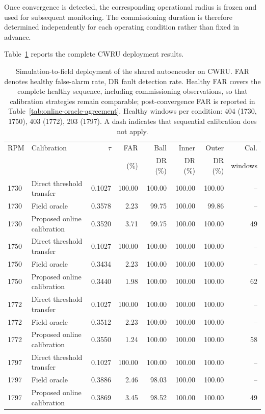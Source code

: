 \documentclass{trbunofficial}
\begin{document}
Once convergence is detected, the corresponding operational radius is frozen
and used for subsequent monitoring. The commissioning duration is therefore
determined independently for each operating condition rather than fixed in
advance.

Table~\ref{tab:shared-deployment} reports the complete CWRU deployment
results.

\begin{table}[!ht]
\centering
\caption{Simulation-to-field deployment of the shared autoencoder on CWRU.
FAR denotes healthy false-alarm rate, DR fault detection rate. Healthy FAR
covers the complete healthy sequence, including commissioning observations,
so that calibration strategies remain comparable; post-convergence FAR is
reported in Table~\ref{tab:online-oracle-agreement}. Healthy windows per condition:
404 (1730, 1750), 403 (1772), 203 (1797). A dash indicates that sequential
calibration does not apply.}
\label{tab:shared-deployment}
\setlength{\tabcolsep}{4pt}
\begin{tabular}{@{}llrrrrrr@{}}
\toprule
RPM & Calibration & $\tau$ & FAR & Ball & Inner & Outer & Cal. \\
    &             &        & (\%) & DR (\%) & DR (\%) & DR (\%) & windows \\
\midrule

1730 & Direct threshold transfer  & 0.1027 & 100.00 & 100.00 & 100.00 & 100.00 & -- \\
1730 & Field oracle               & 0.3578 &   2.23 &  99.75 & 100.00 &  99.86 & -- \\
1730 & Proposed online calibration& 0.3520 &   3.71 &  99.75 & 100.00 & 100.00 & 49 \\

\addlinespace

1750 & Direct threshold transfer  & 0.1027 & 100.00 & 100.00 & 100.00 & 100.00 & -- \\
1750 & Field oracle               & 0.3434 &   2.23 & 100.00 & 100.00 & 100.00 & -- \\
1750 & Proposed online calibration& 0.3440 &   1.98 & 100.00 & 100.00 & 100.00 & 62 \\

\addlinespace

1772 & Direct threshold transfer  & 0.1027 & 100.00 & 100.00 & 100.00 & 100.00 & -- \\
1772 & Field oracle               & 0.3512 &   2.23 & 100.00 & 100.00 & 100.00 & -- \\
1772 & Proposed online calibration& 0.3550 &   1.24 & 100.00 & 100.00 & 100.00 & 58 \\

\addlinespace

1797 & Direct threshold transfer  & 0.1027 & 100.00 & 100.00 & 100.00 & 100.00 & -- \\
1797 & Field oracle               & 0.3886 &   2.46 &  98.03 & 100.00 & 100.00 & -- \\
1797 & Proposed online calibration& 0.3869 &   3.45 &  98.52 & 100.00 & 100.00 & 49 \\

\bottomrule
\end{tabular}
\end{table}
\end{document}
